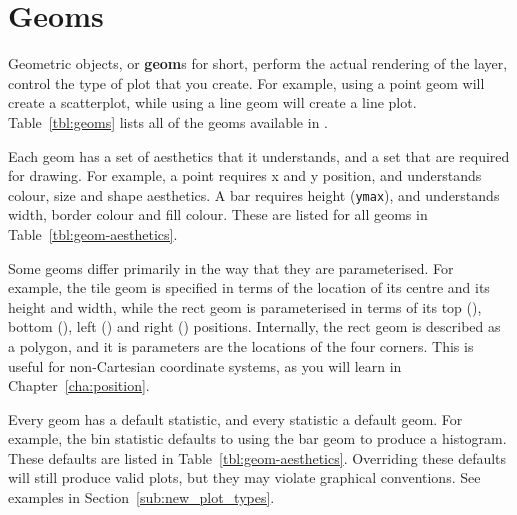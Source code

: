 % 


\section{Geoms}
\label{sec:geom}

Geometric objects, or {\bf geom}s for short, perform the actual rendering of the layer, control the type of plot that you create.  For example, using a point geom will create a scatterplot, while using a line geom will create a line plot.  Table~\ref{tbl:geoms} lists all of the geoms available in \ggplot.  

Each geom has a set of aesthetics that it understands, and a set that are required for drawing.  For example, a point requires x and y position, and understands colour, size and shape aesthetics.  A bar requires height ({\tt ymax}), and understands width, border colour and fill colour.  These are listed for all geoms in Table~\ref{tbl:geom-aesthetics}.

Some geoms differ primarily in the way that they are parameterised.  For example, the tile geom is specified in terms of the location of its centre and its height and width, while the rect geom is parameterised in terms of its top (), bottom (), left () and right () positions.  Internally, the rect geom is described as a polygon, and it is parameters are the locations of the four corners.  This is useful for non-Cartesian coordinate systems, as you will learn in Chapter~\ref{cha:position}.

Every geom has a default statistic, and every statistic a default geom.  For example, the bin statistic defaults to using the bar geom to produce a histogram.  These defaults are listed in Table~\ref{tbl:geom-aesthetics}.  Overriding these defaults will still produce valid plots, but they may violate graphical conventions.  See examples in Section~\ref{sub:new_plot_types}.


